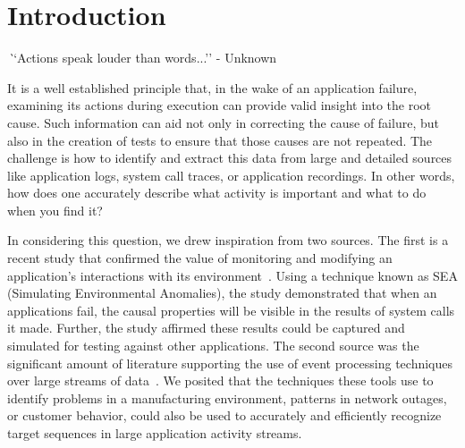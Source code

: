 \section{Introduction}
\label{SEC:introduction}


{\textit ``Actions speak louder than words...'' - Unknown}


It is a well established principle
that, in the wake of an application failure,
examining its actions
during execution can provide valid insight
into the root cause.
Such information
can aid not only in correcting
the cause of failure,
but also in the creation
of tests to ensure
that those causes
are not repeated.
The challenge is 
how to identify and extract this data
from large and detailed sources like application logs,
system call traces,
or application recordings.
In other words, how does one
accurately describe what activity is important
and what to do when you find it?

In considering this question,  we drew inspiration from two sources. The
first is a recent study that confirmed the value of monitoring and
modifying an application’s  interactions with its environment~\cite{DBLP:conf/issre/MooreCFW19}.  Using a technique known as SEA (Simulating Environmental Anomalies),  the study demonstrated that when an applications fail, the causal properties
will be visible in the results of system calls it made. Further, the study affirmed these results could
be captured and simulated for testing against other applications.  The
second source was the  significant amount of literature supporting the use of event
processing techniques over large streams of data~\cite{DBLP:conf/sigmod/AgrawalDGI08,DBLP:conf/debs/Hirzel12,DBLP:journals/ibmrd/HirzelAGJKKMNSSW13,DBLP:journals/csur/DayarathnaP18}. We posited that the techniques these tools
use to identify problems in a manufacturing environment, patterns in
network outages, or customer behavior, could also be used to accurately and efficiently recognize target
sequences in large
application activity streams.

